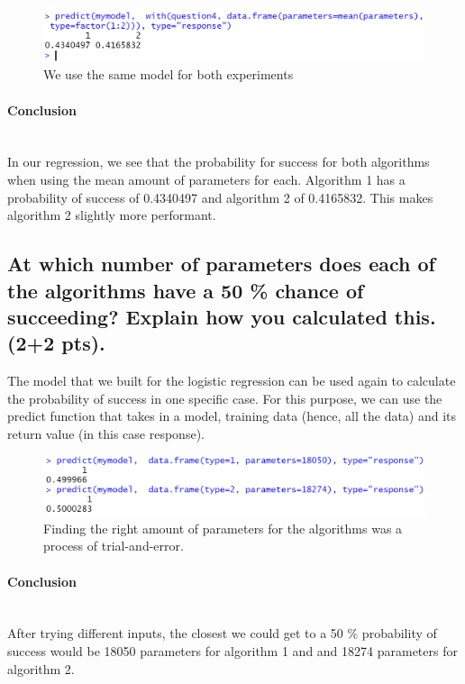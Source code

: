 \documentclass[14]{article}
\begin{document}
\begin{figure}[!htb]
	\includegraphics[width=1.0\textwidth]{img/question4/question4_groups.PNG}
	\captionsetup{width=1.0\textwidth}
	\centering 
	\caption{We use the same model for both experiments}
\end{figure}\mbox{}

\paragraph{Conclusion}\mbox{}\\
In our regression, we see that the probability for success for both algorithms when using the mean amount of parameters for each. Algorithm 1 has a probability of success of 0.4340497 and algorithm 2 of 0.4165832. This makes algorithm 2 slightly more performant.

\subsection{At which number of parameters does each of the algorithms have a 50 \% chance of succeeding? Explain how you calculated this. (2+2 pts).}
The model that we built for the logistic regression can be used again to calculate the probability of success in one specific case. For this purpose, we can use the predict function that takes in a model, training data (hence, all the data) and its return value (in this case response).

\begin{figure}[!htb]
	\includegraphics[width=1.0\textwidth]{img/question4/R_50_Percent_Chance.PNG}
	\captionsetup{width=1.0\textwidth}
	\centering 
	\caption{Finding the right amount of parameters for the algorithms was a process of trial-and-error. }
\end{figure}
	
\paragraph{Conclusion}\mbox{}\\
After trying different inputs, the closest we could get to a 50 \% probability of success would be 18050 parameters for algorithm 1 and and 18274 parameters for algorithm 2.
\end{document}
